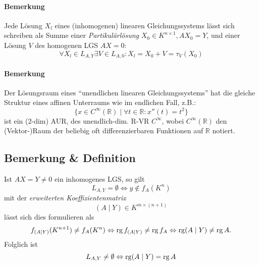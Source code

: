 \paragraph{Bemerkung}
	Jede Lösung $ X_l $ eines (inhomogenen) linearen Gleichungssystems lässt sich schreiben als Summe einer \emph{Partikulärlösung} $ X_0 \in K^{n\times 1},AX_0 = Y $, und einer Lösung $V$ des homogenen LGS $ AX = 0 $:
		\[ \forall X_l\in L_{A,Y}\exists V\in L_{A,0}:X_l=X_0+V=\tau_V(X_0) \]
\paragraph{Bemerkung}
	Der Lösungsraum eines "`unendlichen linearen Gleichungssystems"' hat die gleiche Struktur eines affinen Unterraums wie im endlichen Fall, z.B.:
		\[ \{x\in C^\infty(\mathbb{R})\mid \forall t\in \mathbb{R}:x''(t) = t^2 \} \]
	ist ein (2-dim) AUR, des unendlich-dim. R-VR $C^\infty$, wobei $ C^\infty(\mathbb{R}) $ den (Vektor-)Raum der beliebig oft differenzierbaren Funktionen auf $ \mathbb{R} $ notiert. 
\subsection{Bemerkung \& Definition}
	\begin{Definition}
	Ist $ AX=Y \neq 0$ ein inhomogenes LGS, so gilt
		\[ L_{A,Y} = \emptyset \Leftrightarrow y\notin f_A(K^n) \]
	mit der \emph{erweiterten Koeffizientenmatrix}
		\[ (A\mid Y) \in K^{m\times (n+1)} \]
	lässt sich dies formulieren als
		\[ f_{(A\mid Y)}(K^{n+1})\neq f_A(K^n) \Leftrightarrow \operatorname{rg} f_{(A\mid Y)}\neq \operatorname{rg} f_A \Leftrightarrow \operatorname{rg} (A\mid Y) \neq \operatorname{rg} A. \]
	Folglich ist
		\[ L_{A,Y} \neq \emptyset \Leftrightarrow \operatorname{rg} (A\mid Y) = \operatorname{rg} A \]
	\end{Definition}
